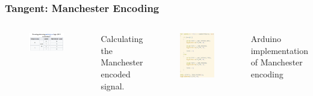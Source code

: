 \documentclass[t]{beamer}
\begin{document}
\begin{frame}[t]
\frametitle{Tangent: Manchester Encoding}
\begin{columns}
		\begin{figure}
			\includegraphics[width=\linewidth]{manchesterCalculation.png}
		\end{figure}
		Calculating the Manchester encoded signal.
	
		\begin{figure}
			\includegraphics[width=0.7\linewidth]{manchesterArduino.png}
		\end{figure}
		Arduino implementation of Manchester encoding 
	
\end{columns}
\end{frame}
\end{document}
